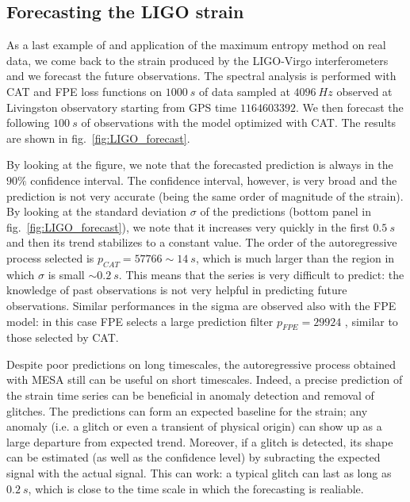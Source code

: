 \documentclass[twocolumn,showpacs,preprintnumbers,nofootinbib,prd,
superscriptaddress,10pt]{revtex4-1}
\begin{document}
\subsection{Forecasting the LIGO strain} \label{sec:LIGO_forecasting}
As a last example of and application of the maximum entropy method on real data, we come back to the strain produced by the LIGO-Virgo interferometers and we forecast the future observations. The spectral analysis is performed with CAT and FPE loss functions on $\SI{1000}{s}$ of data \cite{Abbott_2021} sampled at $\SI{4096}{Hz}$ observed at Livingston observatory starting from GPS time $1164603392$.
We then forecast the following $\SI{100}{s}$ of observations with the model optimized with CAT. The results are shown in fig.~\ref{fig:LIGO_forecast}.

By looking at the figure, we note that the forecasted prediction is always in the $90\%$ confidence interval.
The confidence interval, however, is very broad and the prediction is not very accurate (being the same order of magnitude of the strain).
By looking at the standard deviation $\sigma$ of the predictions (bottom panel in fig.~\ref{fig:LIGO_forecast}), we note that it increases very quickly in the first $\SI{0.5}{s}$ and then its trend stabilizes to a constant value.
The order of the autoregressive process selected is $p_{CAT} = 57766 \sim \SI{14}{s}$, which is much larger than the region in which $\sigma$ is small $\sim \SI{0.2}{s}$. This means that the series is very difficult to predict: the knowledge of past observations is not very helpful in predicting future observations.
Similar performances in the sigma are observed also with the FPE model: in this case FPE selects a large prediction filter $p_{FPE} = 29924$ , similar to those selected by CAT.

Despite poor predictions on long timescales, the autoregressive process obtained with MESA still can be useful on short timescales. Indeed, a precise prediction of the strain time series can be beneficial in anomaly detection and removal of glitches. The predictions can form an expected baseline for the strain; any anomaly (i.e. a glitch or even a transient of physical origin) can show up as a large departure from expected trend.
Moreover, if a glitch is detected, its shape can be estimated (as well as the confidence level) by subracting the expected signal with the actual signal.
This can work: a typical glitch \cite{Zevin_2017} can last as long as $\SI{0.2}{s}$, which is close to the time scale in which the forecasting is realiable.
\end{document}
